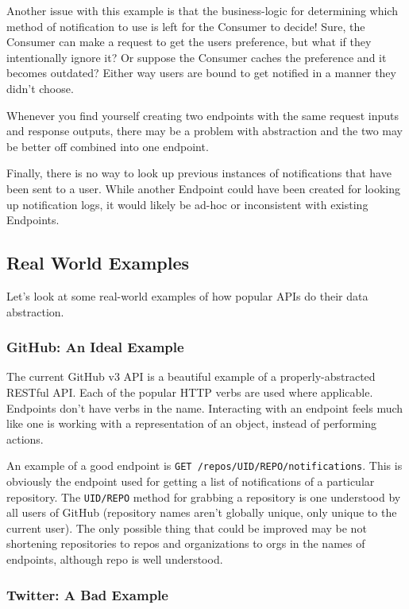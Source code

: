 \documentclass{book}
\begin{document}
Another issue with this example is that the business-logic for determining which method of notification to use is left for the Consumer to decide! Sure, the Consumer can make a request to get the users preference, but what if they intentionally ignore it? Or suppose the Consumer caches the preference and it becomes outdated? Either way users are bound to get notified in a manner they didn't choose.

Whenever you find yourself creating two endpoints with the same request inputs and response outputs, there may be a problem with abstraction and the two may be better off combined into one endpoint.

Finally, there is no way to look up previous instances of notifications that have been sent to a user. While another Endpoint could have been created for looking up notification logs, it would likely be ad-hoc or inconsistent with existing Endpoints.

\subsection{Real World Examples}

Let's look at some real-world examples of how popular APIs do their data abstraction.

\subsubsection{GitHub: An Ideal Example}

The current GitHub v3 API \cite{GITHUBAPI} is a beautiful example of a properly-abstracted RESTful API. Each of the popular HTTP verbs are used where applicable. Endpoints don't have verbs in the name. Interacting with an endpoint feels much like one is working with a representation of an object, instead of performing actions.

An example of a good endpoint is \texttt{GET /repos/UID/REPO/notifications}. This is obviously the endpoint used for getting a list of notifications of a particular repository. The \texttt{UID/REPO} method for grabbing a repository is one understood by all users of GitHub (repository names aren't globally unique, only unique to the current user). The only possible thing that could be improved may be not shortening repositories to repos and organizations to orgs in the names of endpoints, although repo is well understood.

\subsubsection{Twitter: A Bad Example}
\end{document}
